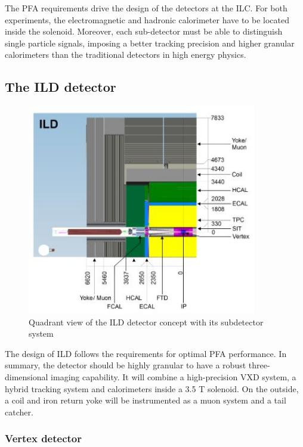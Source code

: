     The \gls{PFA} requirements drive the design of the detectors at the ILC.
    For both experiments, the electromagnetic and hadronic calorimeter have to be located inside the solenoid.
    Moreover, each sub-detector must be able to distinguish single particle signals, imposing a better tracking precision and higher granular calorimeters than the traditional detectors in high energy physics.

    \subsection{The ILD detector}
    
    \begin{figure}[!h]
      \centering
      \includegraphics[width = 10cm]{Pictures/ILC/fig_ILD_Quadrant.png}
      \caption{Quadrant view of the ILD detector concept with its subdetector system \cite{Behnke2010}}
      \label{fig:ILD}
    \end{figure}

    The design of \gls{ILD} follows the requirements for optimal \gls{PFA} performance.
    In summary, the detector should be highly granular to have a robust three-dimensional imaging capability.
    It will combine a high-precision \gls{VXD} system, a hybrid tracking system and calorimeters inside a 3.5 T solenoid. 
    On the outside, a coil and iron return yoke will be instrumented as a muon system and a tail catcher.

      \subsubsection{Vertex detector}


